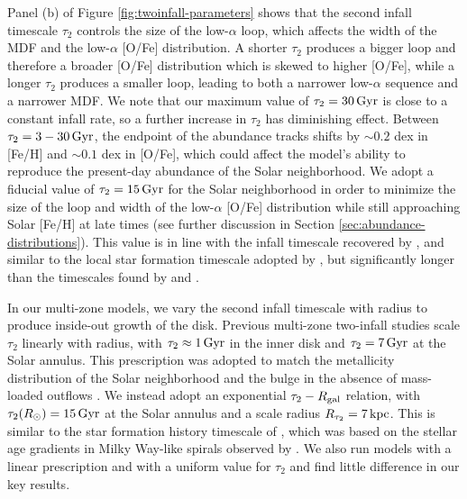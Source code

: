 \documentclass[twocolumn,twocolappendix,linenumbers]{aastex631}
\newcommand{\todo}[1]{{\color{red}#1}}
\newcommand{\kpc}{\,{\rm kpc}}
\newcommand{\Gyr}{\,{\rm Gyr}}
\begin{document}
Panel (b) of Figure \ref{fig:twoinfall-parameters} shows that 
the second infall timescale $\tau_2$ controls the size of the low-$\alpha$ loop, which affects the width of the MDF and the low-$\alpha$ [O/Fe] distribution. A shorter $\tau_2$ produces a bigger loop and therefore a broader [O/Fe] distribution which is skewed to higher [O/Fe], while a longer $\tau_2$ produces a smaller loop, leading to both a narrower low-$\alpha$ sequence and a narrower MDF. We note that our maximum value of $\tau_2=30\,{\rm Gyr}$ is close to a constant infall rate, so a further increase in $\tau_2$ has diminishing effect. Between $\tau_2=3-30\,{\rm Gyr}$, the endpoint of the abundance tracks shifts by $\sim0.2$ dex in [Fe/H] and $\sim0.1$ dex in [O/Fe], which could affect the model's ability to reproduce the present-day abundance of the Solar neighborhood. We adopt a fiducial value of $\tau_2=15\,{\rm Gyr}$ for the Solar neighborhood in order to minimize the size of the loop and width of the low-$\alpha$ [O/Fe] distribution while still approaching Solar [Fe/H] at late times (see further discussion in Section \ref{sec:abundance-distributions}). This value is in line with the infall timescale recovered by \citet{spitoni_galactic_2020}, and similar to the local star formation timescale adopted by \citet{johnson_stellar_2021}, but significantly longer than the timescales found by \citet{nissen_high-precision_2020} and \citet{spitoni_apogee_2021}. 

In our multi-zone models, we vary the second infall timescale with radius to produce inside-out growth of the disk. Previous multi-zone two-infall studies \citep[e.g.,][]{chiappini_abundance_2001,palla_chemical_2020} scale $\tau_2$ linearly with radius, with $\tau_2\approx1\Gyr$ in the inner disk and $\tau_2=7\Gyr$ at the Solar annulus. This prescription was adopted to match the metallicity distribution of the Solar neighborhood and the bulge in the absence of mass-loaded outflows \citep{romano_mass_2000}. We instead adopt an exponential $\tau_2 - R_{\rm gal}$ relation, with $\tau_2(R_\odot)=15\Gyr$ at the Solar annulus and a scale radius $R_{\tau_2}=7\kpc$. This is similar to the star formation history timescale of \citet{johnson_stellar_2021}, which was based on the  stellar age gradients in Milky Way-like spirals observed by \citet{sanchez_spatially_2020}. We also run models with a linear prescription and with a uniform value for $\tau_2$ and find little difference in our key results.
\end{document}
